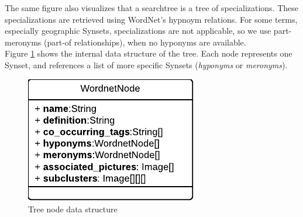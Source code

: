 The same figure also visualizes that a searchtree is a tree of specializations. These specializations are retrieved using WordNet's hypnoym relations. For some terms, especially geographic Synsets, specializations are not applicable, so we use part-meronyms (part-of relationships), when no hyponyms are available.\\


Figure \ref{fig_nodestructure} shows the internal data structure of the tree. Each node represents one Synset, and references a list of more specific Synsets (\emph{hyponyms} or \emph{meronyms}).

\begin{figure}[h]
\centering
\includegraphics[]{images/wordnetnode_class_diagram.pdf}
\caption{Tree node data structure}
\label{fig_nodestructure}
\end{figure}


